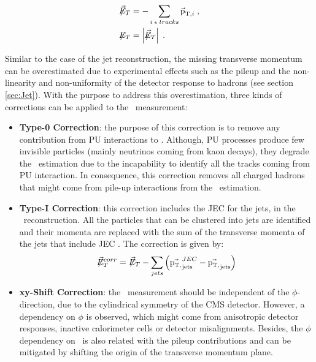\begin{equation} \label{eq:MET}
\begin{aligned}
\not\!\!\vec{E}_T &= -  \sum_{i \; \epsilon \; tracks} \vec{\textrm{p}}_{\textrm{T}, i} \; , \\
\not\!\!E_T &= \left| \not\!\!\vec{E}_T \right| \;.
\end{aligned}
\end{equation}

\noindent Similar to the case of the jet reconstruction, the missing transverse momentum
can be overestimated due to experimental effects such 
as the pileup and the non-linearity and non-uniformity of the detector response to 
hadrons (see section \ref{sec:Jet}). With the purpose to address this overestimation, 
three kinds of corrections can be applied to the \METv~measurement:

\begin{itemize}
 \item \textbf{Type-0 Correction}: the purpose of this correction is to remove any contribution 
 from PU interactions to \METv. Although, PU processes produce few invisible particles (mainly
 neutrinos coming from kaon decays), they degrade the \METv~estimation due to the incapability
 to identify all the tracks coming from PU interaction. In consequence, this correction 
 removes all charged hadrons that might come from pile-up interactions from the \METv~estimation.
  \item \textbf{Type-I Correction}: this correction includes the JEC for the jets, in the 
  \METv~reconstruction. All the particles that can be clustered into jets are identified 
  and their momenta are replaced with the sum of the transverse momenta of the 
  jets that include JEC \cite{METPerformance2}. The correction is given by:
  \begin{equation}
  \label{eq:METcorrection}
  \not\!\!\vec{E}_T^{corr} =~\not\!\!\vec{E}_T - \sum_{jets} \left( \vec{\textrm{p}_{\textrm{T,}}}_{\textrm{jets}}^{JEC} - \vec{\textrm{p}_{\textrm{T,}}}_{\textrm{jets}} \right)
\end{equation} 
 
 \item \textbf{xy-Shift Correction}: the \MET~measurement should be independent of the $\phi$-direction,
 due to the cylindrical symmetry of the CMS detector. However, a dependency on $\phi$ is observed, which 
 might come from anisotropic detector responses, inactive calorimeter cells or detector 
 misalignments. Besides, the $\phi$ dependency on \MET~is also related with the pileup
 contributions and can be mitigated by shifting the origin of the transverse momentum plane.
\end{itemize}


